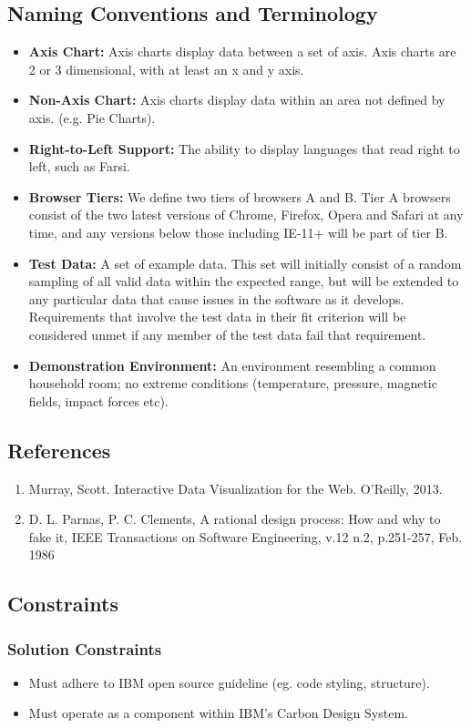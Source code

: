 \documentclass[12pt, titlepage]{article}
\begin{document}
\subsection{Naming Conventions and Terminology}
\begin{itemize}
    \item \textbf{Axis Chart:} Axis charts display data between a set of axis. Axis charts are 2 or 3 dimensional, with at least an x and y axis.
    \item \textbf{Non-Axis Chart:} Axis charts display data within an area not defined by axis. (e.g. Pie Charts).
    \item \textbf{Right-to-Left Support:} The ability to display languages that read right to left, such as Farsi.
    \item \textbf{Browser Tiers:} We define two tiers of browsers A and B. Tier A browsers consist of the two latest versions of Chrome, Firefox, Opera and Safari at any time, and any versions below those including IE-11+ will be part of tier B.
    \item \textbf{Test Data:} A set of example data. This set will initially consist of a random sampling of all valid data within the expected range, but will be extended to any particular data that cause issues in the software as it develops. Requirements that involve the test data in their fit criterion will be considered unmet if any member of the test data fail that requirement.
    \item \textbf{Demonstration Environment:} An environment resembling a common household room; no extreme conditions (temperature, pressure, magnetic fields, impact forces etc).
\end{itemize}
\subsection{References}
\begin{enumerate}
    \item Murray, Scott. Interactive Data Visualization for the Web. O'Reilly, 2013.
    \item D. L. Parnas, P. C. Clements, A rational design process: How and why to fake it, IEEE Transactions on Software Engineering, v.12 n.2, p.251-257, Feb. 1986
\end{enumerate}
\subsection{Constraints}
\subsubsection{Solution Constraints}
\begin{itemize}
    \item Must adhere to IBM open source guideline (eg. code styling, structure).
    \item Must operate as a component within IBM's Carbon Design System.
\end{itemize}
\end{document}
